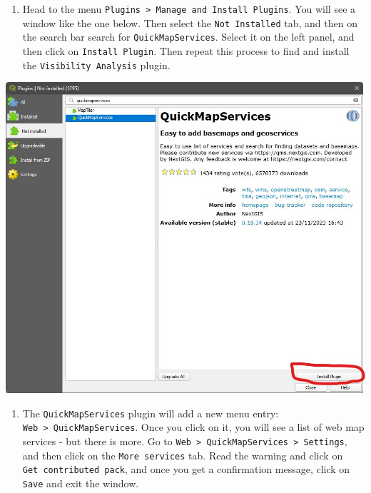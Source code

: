 \documentclass[
  letterpaper,
  DIV=11,
  numbers=noendperiod]{scrreprt}
\providecommand{\tightlist}{%
  \setlength{\itemsep}{0pt}\setlength{\parskip}{0pt}}\usepackage{longtable,booktabs,array}
\begin{document}
\begin{enumerate}
\def\labelenumi{(\arabic{enumi})}
\setcounter{enumi}{143}
\tightlist
\item
  Head to the menu
  \texttt{Plugins\ \textgreater{}\ Manage\ and\ Install\ Plugins}. You
  will see a window like the one below. Then select the
  \texttt{Not\ Installed} tab, and then on the search bar search for
  \texttt{QuickMapServices}. Select it on the left panel, and then click
  on \texttt{Install\ Plugin}. Then repeat this process to find and
  install the \texttt{Visibility\ Analysis} plugin.
\end{enumerate}

\includegraphics{images/lab_5/lab5_fig2_quickmap.jpg}

\begin{enumerate}
\def\labelenumi{(\arabic{enumi})}
\setcounter{enumi}{144}
\tightlist
\item
  The \texttt{QuickMapServices} plugin will add a new menu entry:
  \texttt{Web\ \textgreater{}\ QuickMapServices}. Once you click on it,
  you will see a list of web map services - but there is more. Go to
  \texttt{Web\ \textgreater{}\ QuickMapServices\ \textgreater{}\ Settings},
  and then click on the \texttt{More\ services} tab. Read the warning
  and click on \texttt{Get\ contributed\ pack}, and once you get a
  confirmation message, click on \texttt{Save} and exit the window.
\end{enumerate}
\end{document}
